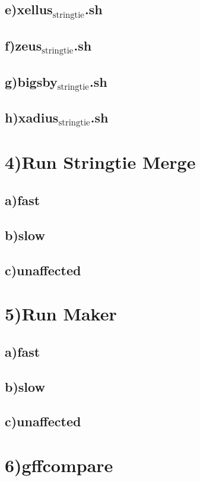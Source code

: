 \documentclass[11pt]{article}
\begin{document}
\subsection{e)xellus$_{\text{stringtie}}$.sh}
\label{sec-3-5}
\subsection{f)zeus$_{\text{stringtie}}$.sh}
\label{sec-3-6}
\subsection{g)bigsby$_{\text{stringtie}}$.sh}
\label{sec-3-7}
\subsection{h)xadius$_{\text{stringtie}}$.sh}
\label{sec-3-8}
\section{4)Run Stringtie Merge}
\label{sec-4}
\subsection{a)fast}
\label{sec-4-1}
\subsection{b)slow}
\label{sec-4-2}
\subsection{c)unaffected}
\label{sec-4-3}
\section{5)Run Maker}
\label{sec-5}
\subsection{a)fast}
\label{sec-5-1}
\subsection{b)slow}
\label{sec-5-2}
\subsection{c)unaffected}
\label{sec-5-3}
\section{6)gffcompare}
\label{sec-6}
\end{document}
